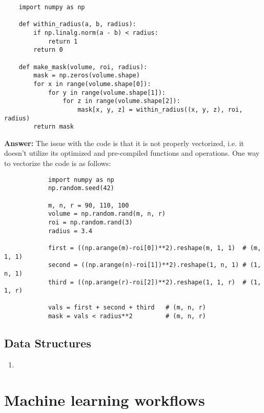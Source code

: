 \documentclass{article}
\newenvironment{QandA}{\begin{enumerate}[label=\arabic*.]}{\end{enumerate}}
\newenvironment{answer}{\par\normalfont \textbf{Answer:}}{}
\begin{document}
\begin{QandA}
    \begin{lstlisting}
    import numpy as np
    
    def within_radius(a, b, radius):
        if np.linalg.norm(a - b) < radius:
            return 1
        return 0
    
    def make_mask(volume, roi, radius):
        mask = np.zeros(volume.shape)
        for x in range(volume.shape[0]):
            for y in range(volume.shape[1]):
                for z in range(volume.shape[2]):
                    mask[x, y, z] = within_radius((x, y, z), roi, radius)
        return mask
    \end{lstlisting}
    
    \begin{answer}
        The issue with the code is that it is not properly vectorized, i.e. it doesn't utilize its optimized and pre-compiled functions and operations. One way to vectorize the code is as follows:
        \begin{lstlisting}
            import numpy as np
            np.random.seed(42)
            
            m, n, r = 90, 110, 100
            volume = np.random.rand(m, n, r)
            roi = np.random.rand(3)
            radius = 3.4
            
            first = ((np.arange(m)-roi[0])**2).reshape(m, 1, 1)  # (m, 1, 1)
            second = ((np.arange(n)-roi[1])**2).reshape(1, n, 1) # (1, n, 1)
            third = ((np.arange(r)-roi[2])**2).reshape(1, 1, r)  # (1, 1, r)
            
            vals = first + second + third   # (m, n, r)
            mask = vals < radius**2         # (m, n, r)
        \end{lstlisting}
        
    \end{answer}
    
\end{QandA}

\subsection{Data Structures}
\begin{QandA}
    \item 
\end{QandA}

\section{Machine learning workflows}
\end{document}
